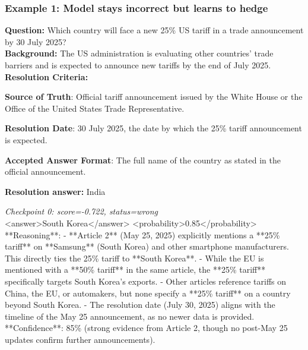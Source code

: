 \subsubsection{Example 1: Model stays incorrect but learns to hedge}

\noindent\textbf{Question:} Which country will face a new 25\% US tariff in a trade announcement by 30 July 2025?\\
\noindent\textbf{Background:} The US administration is evaluating other countries' trade barriers and is expected to announce new tariffs by the end of July 2025.\\
\noindent\textbf{Resolution Criteria:}

\textbf{Source of Truth}: Official tariff announcement issued by the White House or the Office of the United States Trade Representative.

\textbf{Resolution Date}: 30 July 2025, the date by which the 25\% tariff announcement is expected.

\textbf{Accepted Answer Format}: The full name of the country as stated in the official announcement.

\noindent\textbf{Resolution answer:} India

\medskip

\noindent\textit{Checkpoint 0: score=-0.722, status=wrong}\\
<answer>South Korea</answer> <probability>0.85</probability> **Reasoning**: - **Article 2** (May 25, 2025) explicitly mentions a **25\% tariff** on **Samsung** (South Korea) and other smartphone manufacturers. This directly ties the 25\% tariff to **South Korea**. - While the EU is mentioned with a **50\% tariff** in the same article, the **25\% tariff** specifically targets South Korea's exports. - Other articles reference tariffs on China, the EU, or automakers, but none specify a **25\% tariff** on a country beyond South Korea. - The resolution date (July 30, 2025) aligns with the timeline of the May 25 announcement, as no newer data is provided. **Confidence**: 85\% (strong evidence from Article 2, though no post-May 25 updates confirm further announcements).

\medskip

